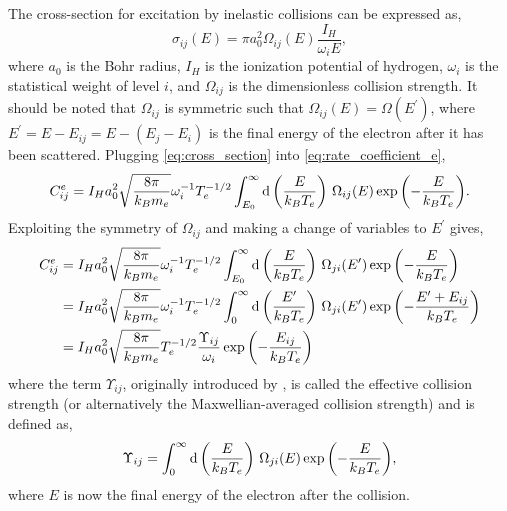 The cross-section for excitation by inelastic collisions can be expressed as,
\begin{equation}\label{eq:cross_section}
    \sigma_{ij}(E) = \pi a_0^2 \Omega_{ij}(E)\frac{I_H}{\omega_iE},
\end{equation}
where $a_0$ is the Bohr radius, $I_H$ is the ionization potential of hydrogen, $\omega_i$ is the statistical weight of level $i$, and $\Omega_{ij}$ is the dimensionless collision strength. It should be noted that $\Omega_{ij}$ is symmetric such that $\Omega_{ij}(E)=\Omega(E^{\prime})$, where $E^{\prime}=E - E_{ij} = E - (E_j - E_i)$ is the final energy of the electron after it has been scattered. Plugging \autoref{eq:cross_section} into \autoref{eq:rate_coefficient_e},
\begin{equation}
    C^e_{ij} = I_Ha_0^2\sqrt{\frac{8\pi}{k_Bm_e}}\omega_i^{-1}T_e^{-1/2}\int_{E_0}^{\infty}\textup{d}\left(\frac{E}{k_BT_e}\right)\,\Omega_{ij}(E)\exp{\left(-\frac{E}{k_BT_e}\right)}.
\end{equation}
Exploiting the symmetry of $\Omega_{ij}$ and making a change of variables to $E^{\prime}$ gives,
\begin{align}\label{eq:rate_coefficient_final}
    C^e_{ij} &= I_Ha_0^2\sqrt{\frac{8\pi}{k_Bm_e}}\omega_i^{-1}T_e^{-1/2}\int_{E_0}^{\infty}\textup{d}\left(\frac{E}{k_BT_e}\right)\,\Omega_{ji}(E^\prime)\exp{\left(-\frac{E}{k_BT_e}\right)} \nonumber\\
    &= I_Ha_0^2\sqrt{\frac{8\pi}{k_Bm_e}}\omega_i^{-1}T_e^{-1/2}\int_{0}^{\infty}\textup{d}\left(\frac{E^\prime}{k_BT_e}\right)\,\Omega_{ji}(E^\prime)\exp{\left(-\frac{E^\prime + E_{ij}}{k_BT_e}\right)} \nonumber\\
    &= I_Ha_0^2\sqrt{\frac{8\pi}{k_Bm_e}}T_e^{-1/2}\frac{\Upsilon_{ij}}{\omega_i}\exp{\left(-\frac{E_{ij}}{k_BT_e}\right)}
\end{align}
where the term $\Upsilon_{ij}$, originally introduced by \citet{seaton_electron_1953}, is called the effective collision strength (or alternatively the Maxwellian-averaged collision strength) and is defined as,
\begin{equation}\label{eq:effective_collision_strength}
    \Upsilon_{ij} = \int_{0}^{\infty}\textup{d}\left(\frac{E}{k_BT_e}\right)\,\Omega_{ji}(E)\exp{\left(-\frac{E}{k_BT_e}\right)},
\end{equation}
where $E$ is now the final energy of the electron after the collision.

